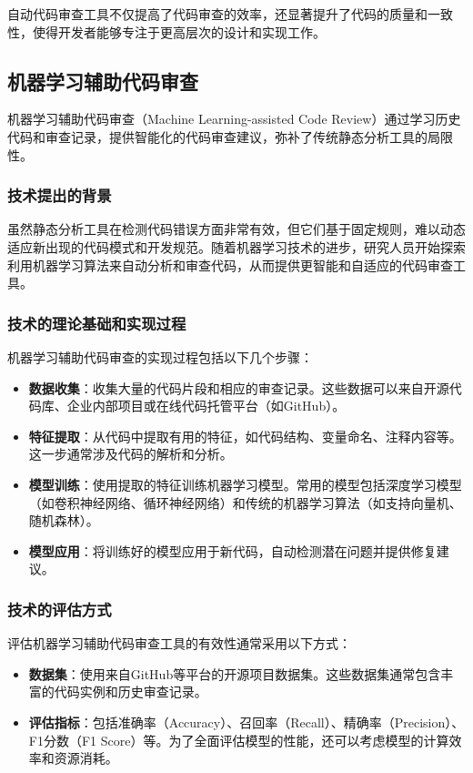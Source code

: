 \documentclass{article}
\begin{document}
自动代码审查工具不仅提高了代码审查的效率，还显著提升了代码的质量和一致性，使得开发者能够专注于更高层次的设计和实现工作。

\subsection{机器学习辅助代码审查}

机器学习辅助代码审查（Machine Learning-assisted Code Review）通过学习历史代码和审查记录，提供智能化的代码审查建议，弥补了传统静态分析工具的局限性。

\subsubsection{技术提出的背景}

虽然静态分析工具在检测代码错误方面非常有效，但它们基于固定规则，难以动态适应新出现的代码模式和开发规范。随着机器学习技术的进步，研究人员开始探索利用机器学习算法来自动分析和审查代码，从而提供更智能和自适应的代码审查工具。

\subsubsection{技术的理论基础和实现过程}

机器学习辅助代码审查的实现过程包括以下几个步骤：

\begin{itemize}
    \item \textbf{数据收集}：收集大量的代码片段和相应的审查记录。这些数据可以来自开源代码库、企业内部项目或在线代码托管平台（如GitHub）。
    \item \textbf{特征提取}：从代码中提取有用的特征，如代码结构、变量命名、注释内容等。这一步通常涉及代码的解析和分析。
    \item \textbf{模型训练}：使用提取的特征训练机器学习模型。常用的模型包括深度学习模型（如卷积神经网络、循环神经网络）和传统的机器学习算法（如支持向量机、随机森林）。
    \item \textbf{模型应用}：将训练好的模型应用于新代码，自动检测潜在问题并提供修复建议。
\end{itemize}

\subsubsection{技术的评估方式}

评估机器学习辅助代码审查工具的有效性通常采用以下方式：

\begin{itemize}
    \item \textbf{数据集}：使用来自GitHub等平台的开源项目数据集。这些数据集通常包含丰富的代码实例和历史审查记录。
    \item \textbf{评估指标}：包括准确率（Accuracy）、召回率（Recall）、精确率（Precision）、F1分数（F1 Score）等。为了全面评估模型的性能，还可以考虑模型的计算效率和资源消耗。
\end{itemize}
\end{document}
